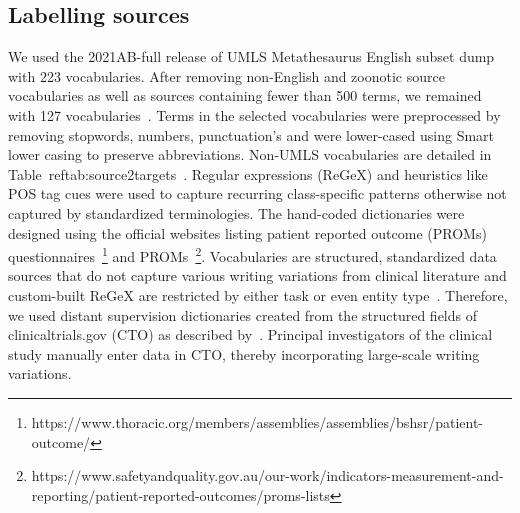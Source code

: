 \documentclass[10.7pt,]{article}
\begin{document}
\subsection{Labelling sources}\label{lss}
%
We used the 2021AB-full release of UMLS Metathesaurus English subset dump with 223 vocabularies.
After removing non-English and zoonotic source vocabularies as well as sources containing fewer than 500 terms, we remained with 127 vocabularies~\cite{humphreys1998unified}.
Terms in the selected vocabularies were preprocessed by removing stopwords, numbers, punctuation's and were lower-cased using Smart lower casing to preserve abbreviations.
Non-UMLS vocabularies are detailed in Table~ref{tab:source2targets}~\cite{schriml2012disease,robinson2008human,he2014oae,de2010chemical,lin2020cto,kronk2020development,geifman2011towards,rogier2021using,lin2018cancer,mohammed2012building,ninot2018definition}.
Regular expressions (ReGeX) and heuristics like POS tag cues were used to capture recurring class-specific patterns otherwise not captured by standardized terminologies.
The hand-coded dictionaries were designed using the official websites listing patient reported outcome (PROMs) questionnaires~\footnote{https://www.thoracic.org/members/assemblies/assemblies/bshsr/patient-outcome/} and PROMs~\footnote{https://www.safetyandquality.gov.au/our-work/indicators-measurement-and-reporting/patient-reported-outcomes/proms-lists}.
Vocabularies are structured, standardized data sources that do not capture various writing variations from clinical literature and custom-built ReGeX are restricted by either task or even entity type~\cite{ratner2017snorkel,safranchik2020weakly}.
Therefore, we used distant supervision dictionaries created from the structured fields of clinicaltrials.gov (CTO) as described by~\cite{dhrangadhariya2022distant}.
Principal investigators of the clinical study manually enter data in CTO, thereby incorporating large-scale writing variations.  
%
%
%
\end{document}
